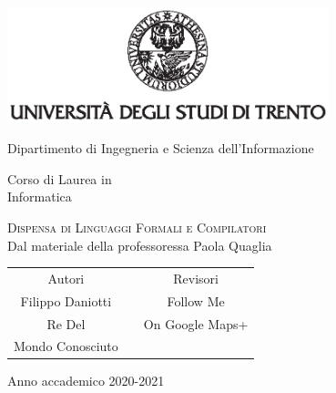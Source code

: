 \documentclass[class=book, crop=false, oneside]{standalone}
\begin{document}
\begin{titlepage}
	\centering
	\includegraphics[width=0.7\textwidth, keepaspectratio]{logo-unitn.eps}

	\vspace{1.4cm}
	\LARGE{Dipartimento di Ingegneria e Scienza dell'Informazione\\}

	\vspace{.9cm}
	\Large{Corso di Laurea in\\ Informatica}

	\vspace{1cm}
	\Huge\textsc{Dispensa di Linguaggi Formali e Compilatori\\}
	\large{Dal materiale della professoressa Paola Quaglia}

	\vspace{2cm}
	\begin{tabularx}{\textwidth}{cXc}
		\Large{Autori} & & \Large{Revisori}\\
		\cmidrule(lr){1-1} \cmidrule(lr){3-3}
		\large{Filippo Daniotti} & & \large{Follow Me}\\
		\large{Re Del} & & \large{On Google Maps+}\\
		\large{Mondo Conosciuto} & & \\
	\end{tabularx}

	\vspace{1.2cm}
	\LARGE{Anno accademico 2020-2021}
\end{titlepage}
\end{document}
